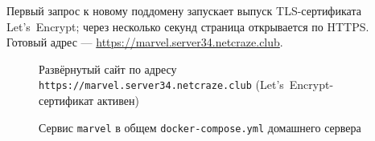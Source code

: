 Первый запрос к новому поддомену запускает выпуск TLS-сертификата
Let's~Encrypt; через несколько секунд страница открывается по HTTPS.
Готовый адрес --- \url{https://marvel.server34.netcraze.club}.

\begin{figure}[h]
  \centering
  \caption{Развёрнутый сайт по адресу
           \texttt{https://marvel.server34.netcraze.club}
           (Let's~Encrypt-сертификат активен)}
  \label{fig:marvel_live}
\end{figure}

\begin{figure}[h]
  \centering
  \caption{Сервис \texttt{marvel} в общем \texttt{docker-compose.yml}
           домашнего сервера}
  \label{fig:compose_ps}
\end{figure}

\endinput
